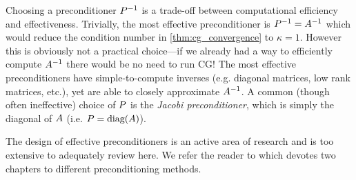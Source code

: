 

Choosing a preconditioner $P^{-1}$ is a trade-off between computational efficiency and effectiveness.
Trivially, the most effective preconditioner is $P^{-1} = A^{-1}$ which would reduce the condition number in \cref{thm:cg_convergence} to $\kappa = 1$.
However this is obviously not a practical choice---if we already had a way to efficiently compute $A^{-1}$ there would be no need to run CG!
The most effective preconditioners have simple-to-compute inverses (e.g. diagonal matrices, low rank matrices, etc.), yet are able to closely approximate $A^{-1}$.
A common (though often ineffective) choice of $P$ is the \emph{Jacobi preconditioner}, which is simply the diagonal of $A$ (i.e. $P = \text{diag}(A)$).

The design of effective preconditioners is an active area of research and is too extensive to adequately review here.
We refer the reader to \cite{saad2003iterative} which devotes two chapters to different preconditioning methods.



